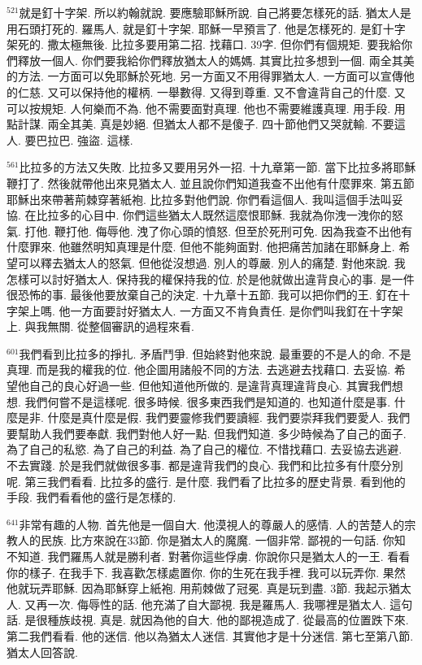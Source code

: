 \documentclass{book}
\begin{document}
$^{521}$就是釘十字架.
所以約翰就說.
要應驗耶穌所說.
自己將要怎樣死的話.
猶太人是用石頭打死的.
羅馬人.
就是釘十字架.
耶穌一早預言了.
他是怎樣死的.
是釘十字架死的.
撒太極無後.
比拉多要用第二招.
找藉口.
39字.
但你們有個規矩.
要我給你們釋放一個人.
你們要我給你們釋放猶太人的媽媽.
其實比拉多想到一個.
兩全其美的方法.
一方面可以免耶穌於死地.
另一方面又不用得罪猶太人.
一方面可以宣傳他的仁慈.
又可以保持他的權柄.
一舉數得.
又得到尊重.
又不會違背自己的什麼.
又可以按規矩.
人何樂而不為.
他不需要面對真理.
他也不需要維護真理.
用手段.
用點計謀.
兩全其美.
真是妙絕.
但猶太人都不是傻子.
四十節他們又哭就輸.
不要這人.
要巴拉巴.
強盜.
這樣.

$^{561}$比拉多的方法又失敗.
比拉多又要用另外一招.
十九章第一節.
當下比拉多將耶穌鞭打了.
然後就帶他出來見猶太人.
並且說你們知道我查不出他有什麼罪來.
第五節耶穌出來帶著荊棘穿著紙袍.
比拉多對他們說.
你們看這個人.
我叫這個手法叫妥協.
在比拉多的心目中.
你們這些猶太人既然這麼恨耶穌.
我就為你洩一洩你的怒氣.
打他.
鞭打他.
侮辱他.
洩了你心頭的憤怒.
但至於死刑可免.
因為我查不出他有什麼罪來.
他雖然明知真理是什麼.
但他不能夠面對.
他把痛苦加諸在耶穌身上.
希望可以釋去猶太人的怒氣.
但他從沒想過.
別人的尊嚴.
別人的痛楚.
對他來說.
我怎樣可以討好猶太人.
保持我的權保持我的位.
於是他就做出違背良心的事.
是一件很恐怖的事.
最後他要放棄自己的決定.
十九章十五節.
我可以把你們的王.
釘在十字架上嗎.
他一方面要討好猶太人.
一方面又不肯負責任.
是你們叫我釘在十字架上.
與我無關.
從整個審訊的過程來看.

$^{601}$我們看到比拉多的掙扎.
矛盾鬥爭.
但始終對他來說.
最重要的不是人的命.
不是真理.
而是我的權我的位.
他企圖用諸般不同的方法.
去逃避去找藉口.
去妥協.
希望他自己的良心好過一些.
但他知道他所做的.
是違背真理違背良心.
其實我們想想.
我們何嘗不是這樣呢.
很多時候.
很多東西我們是知道的.
也知道什麼是事.
什麼是非.
什麼是真什麼是假.
我們要靈修我們要讀經.
我們要崇拜我們要愛人.
我們要幫助人我們要奉獻.
我們對他人好一點.
但我們知道.
多少時候為了自己的面子.
為了自己的私慾.
為了自己的利益.
為了自己的權位.
不惜找藉口.
去妥協去逃避.
不去實踐.
於是我們就做很多事.
都是違背我們的良心.
我們和比拉多有什麼分別呢.
第三我們看看.
比拉多的盛行.
是什麼.
我們看了比拉多的歷史背景.
看到他的手段.
我們看看他的盛行是怎樣的.

$^{641}$非常有趣的人物.
首先他是一個自大.
他漠視人的尊嚴人的感情.
人的苦楚人的宗教人的民族.
比方來說在33節.
你是猶太人的魔魔.
一個非常.
鄙視的一句話.
你知不知道.
我們羅馬人就是勝利者.
對著你這些俘虜.
你說你只是猶太人的一王.
看看你的樣子.
在我手下.
我喜歡怎樣處置你.
你的生死在我手裡.
我可以玩弄你.
果然他就玩弄耶穌.
因為耶穌穿上紙袍.
用荊棘做了冠冕.
真是玩到盡.
3節.
我起示猶太人.
又再一次.
侮辱性的話.
他充滿了自大鄙視.
我是羅馬人.
我哪裡是猶太人.
這句話.
是很種族歧視.
真是.
就因為他的自大.
他的鄙視造成了.
從最高的位置跌下來.
第二我們看看.
他的迷信.
他以為猶太人迷信.
其實他才是十分迷信.
第七至第八節.
猶太人回答說.
\end{document}
